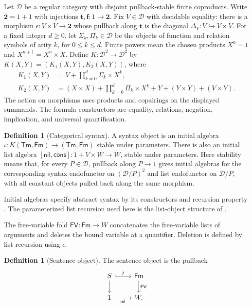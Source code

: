 \documentclass[11pt]{article}
\theoremstyle{definition}\newtheorem{definition}[theorem]{Definition}
\newcommand{\Fm}{\mathsf{Fm}}
\newcommand{\D}{\mathcal D}
\begin{document}
Let $\D$ be a regular category with disjoint pullback-stable finite
coproducts. Write $\mathbf2=1+1$ with injections
$\mathbf t,\mathbf f:1\to\mathbf2$.
Fix $V\in\D$ with decidable equality: there is a morphism
$\epsilon:V\times V\to\mathbf2$ whose pullback along $\mathbf t$
is the diagonal $\Delta_V:V\hookrightarrow V\times V$.
For a fixed integer $d\ge0$, let $\Sigma_k,\Pi_k\in\D$ be
the objects of function and relation symbols of arity $k$, for
$0\le k\le d$. Finite powers mean the chosen products
$X^0=1$ and $X^{n+1}=X^n\times X$.
Define $K:\D^2\to\D^2$ by
$K(X,Y)=(K_1(X,Y),K_2(X,Y))$, where
\[
 \begin{aligned}
 K_1(X,Y)&=V+\coprod_{k=0}^d\Sigma_k\times X^k,\\
 K_2(X,Y)&=(X\times X)+\coprod_{k=0}^d\Pi_k\times X^k
                    +Y+(Y\times Y)+(V\times Y).
 \end{aligned}
\]
The action on morphisms uses products and copairings on the
displayed summands. The formula constructors are equality,
relations, negation, implication, and universal quantification.

\begin{definition}[Categorical syntax]
A syntax object is an initial algebra
$\iota:K(\mathsf{Tm},\Fm)\to(\mathsf{Tm},\Fm)$ stable under
parameters. There is also an initial list algebra
$[\mathsf{nil},\mathsf{cons}]:1+V\times W\to W$, stable under
parameters. Here stability means that, for every $P\in\D$,
pullback along $P\to1$ gives initial algebras for the corresponding
syntax endofunctor on $(\D/P)^2$ and list endofunctor on $\D/P$,
with all constant objects pulled back along the same morphism.
\end{definition}
Initial algebras specify abstract syntax by its constructors and
recursion property \cite{GTWW}. The parameterized list recursion
used here is the list-object structure of \cite{CockettLists}.

The free-variable fold $\mathsf{FV}:\Fm\to W$ concatenates the
free-variable lists of arguments and deletes the bound variable at
a quantifier. Deletion is defined by list recursion using $\epsilon$.

\begin{definition}[Sentence object]
The sentence object is the pullback
\[
\begin{tikzcd}
 S\arrow[r,hook,"j"]\arrow[d] & \Fm\arrow[d,"\mathsf{FV}"]\\
 1\arrow[r,"\mathsf{nil}"'] & W.
\end{tikzcd}
\]
\end{definition}
\end{document}
